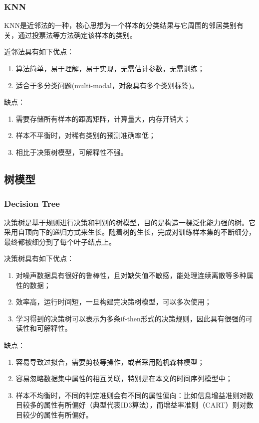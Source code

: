 \documentclass[UTF8]{ctexart}
\begin{document}
\subsubsection{KNN}
KNN是近邻法的一种，核心思想为一个样本的分类结果与它周围的邻居类别有关，通过投票法等方法确定该样本的类别。

近邻法具有如下优点：
\begin{enumerate}[(1)]
	\item 算法简单，易于理解，易于实现，无需估计参数，无需训练；
	\item 适合于多分类问题(multi-modal，对象具有多个类别标签)。
\end{enumerate}

缺点：
\begin{enumerate}[(1)]
	\item 需要存储所有样本的距离矩阵，计算量大，内存开销大；
	\item 样本不平衡时，对稀有类别的预测准确率低；
	\item 相比于决策树模型，可解释性不强。
\end{enumerate}


\subsection{树模型}

\subsubsection{Decision Tree}
决策树是基于规则进行决策和判别的树模型，目的是构造一棵泛化能力强的树。它采用自顶向下的递归方式来生长。随着树的生长，完成对训练样本集的不断细分，最终都被细分到了每个叶子结点上。


决策树具有如下优点：
\begin{enumerate}[(1)]
	\item 对噪声数据具有很好的鲁棒性，且对缺失值不敏感，能处理连续离散等多种属性的数据；
	\item 效率高，运行时间短，一旦构建完决策树模型，可以多次使用；
	\item 学习得到的决策树可以表示为多条if-then形式的决策规则，因此具有很强的可读性和可解释性。
\end{enumerate}

缺点：
\begin{enumerate}[(1)]
	\item 容易导致过拟合，需要剪枝等操作，或者采用随机森林模型；
	\item 容易忽略数据集中属性的相互关联，特别是在本文的时间序列模型中；
	\item 样本不均衡时，不同的判定准则会有不同的属性偏向：比如信息增益准则对数目较多的属性有所偏好（典型代表ID3算法），而增益率准则（CART）则对数目较少的属性有所偏好。
\end{enumerate}
\end{document}
